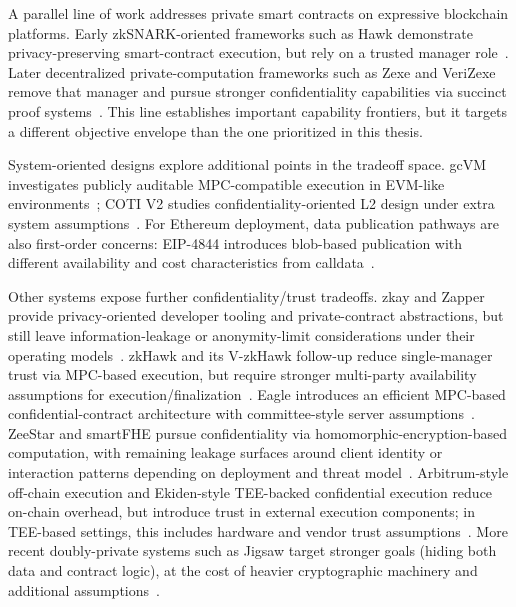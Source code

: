 \documentclass[final,twoside]{vutinfth}
\begin{document}
A parallel line of work addresses private smart contracts on expressive blockchain platforms. Early zkSNARK-oriented frameworks such as Hawk demonstrate privacy-preserving smart-contract execution, but rely on a trusted manager role~\cite{Kosba2016Hawk}. Later decentralized private-computation frameworks such as Zexe and VeriZexe remove that manager and pursue stronger confidentiality capabilities via succinct proof systems~\cite{Bowe2018Zexe,Xiong2023VeriZexe}. This line establishes important capability frontiers, but it targets a different objective envelope than the one prioritized in this thesis.

System-oriented designs explore additional points in the tradeoff space. gcVM investigates publicly auditable MPC-compatible execution in EVM-like environments~\cite{Yanai2026gcVM}; COTI V2 studies confidentiality-oriented L2 design under extra system assumptions~\cite{Haloani2024COTIv2}. For Ethereum deployment, data publication pathways are also first-order concerns: EIP-4844 introduces blob-based publication with different availability and cost characteristics from calldata~\cite{Buterin2022EIP4844}.

Other systems expose further confidentiality/trust tradeoffs. zkay and Zapper provide privacy-oriented developer tooling and private-contract abstractions, but still leave information-leakage or anonymity-limit considerations under their operating models~\cite{zkay2019,Zapper2022}. zkHawk and its V-zkHawk follow-up reduce single-manager trust via MPC-based execution, but require stronger multi-party availability assumptions for execution/finalization~\cite{zkHawk2021,VzkHawk2022}. Eagle introduces an efficient MPC-based confidential-contract architecture with committee-style server assumptions~\cite{Eagle2023}. ZeeStar and smartFHE pursue confidentiality via homomorphic-encryption-based computation, with remaining leakage surfaces around client identity or interaction patterns depending on deployment and threat model~\cite{ZeeStar2022,SmartFHE2023}. Arbitrum-style off-chain execution and Ekiden-style TEE-backed confidential execution reduce on-chain overhead, but introduce trust in external execution components; in TEE-based settings, this includes hardware and vendor trust assumptions~\cite{Arbitrum2018,Ekiden2019}. More recent doubly-private systems such as Jigsaw target stronger goals (hiding both data and contract logic), at the cost of heavier cryptographic machinery and additional assumptions~\cite{Jigsaw2025}.
\end{document}
